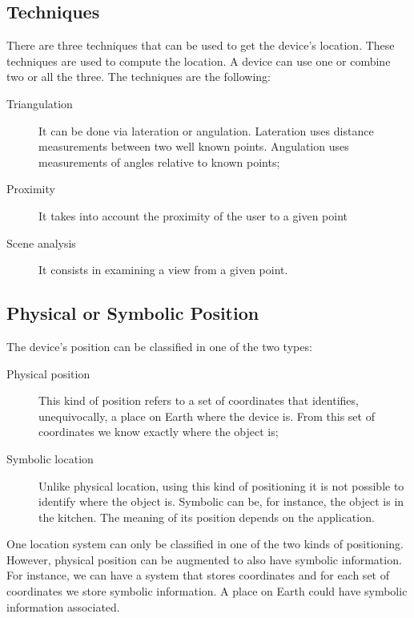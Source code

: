 \subsection{Techniques}
\label{sub:background_techniques}
There are three techniques that can be used to get the device's location.
These techniques are used to compute the location.
A device can use one or combine two or all the three.
The techniques are the following:
\begin{description}
  \item[Triangulation] It can be done via lateration or angulation. Lateration uses distance measurements between two well known points.
  Angulation uses measurements of angles relative to known points;
  \item[Proximity] It takes into account the proximity of the user to a given point
  \item[Scene analysis] It consists in examining a view from a given point.
\end{description}

\subsection{Physical or Symbolic Position}
\label{sub:background_physical_or_symbolic_position}
The device's position can be classified in one of the two types:
\begin{description}
  \item[Physical position] This kind of position refers to a set of coordinates that identifies, unequivocally, a place on Earth where the device is. From this set of coordinates we know exactly where the object is;
  \item[Symbolic location] Unlike physical location, using this kind of positioning it is not possible to identify where the object is. Symbolic can be, for instance, the object is in the kitchen.
  The meaning of its position depends on the application.
\end{description}

One location system can only be classified in one of the two kinds of positioning.
However, physical position can be augmented to also have symbolic information.
For instance, we can have a system that stores coordinates and for each set of coordinates we store symbolic information.
A place on Earth could have symbolic information associated.

